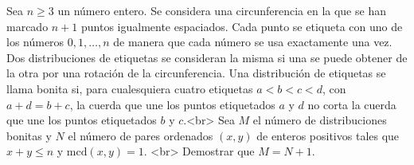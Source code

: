 Sea $n \geq 3$ un número entero. Se considera una circunferencia en la que se han marcado $n + 1$ puntos igualmente espaciados. Cada punto se etiqueta con uno de los números $0, 1, \dots, n$ de manera que cada número se usa exactamente una vez. Dos distribuciones de etiquetas se consideran la misma si una se puede obtener de la otra por una rotación de la circunferencia. Una distribución de etiquetas se llama bonita si, para cualesquiera cuatro etiquetas $a \lt b \lt c \lt d$, con $a + d = b + c$, la cuerda que une los puntos etiquetados $a$ y $d$ no corta la cuerda que une los puntos etiquetados $b$ y $c$.<br>
Sea $M$ el número de distribuciones bonitas y $N$ el número de pares ordenados $(x,y)$ de enteros positivos tales que $x + y \leq n$ y $\text{mcd} (x, y) = 1$. <br>
Demostrar que $M=N+1$.